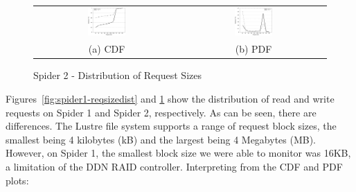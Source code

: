 \begin{figure}[!t]
\begin{center}
\begin{tabular}{cc}
\hspace*{-1cm}                                                           
{\includegraphics[width=0.27\textwidth]{./figs/spider2-reqSizeCDF.eps}}&
\hspace{-2mm}
{\includegraphics[width=0.27\textwidth]{./figs/spider2-reqSizePDF.eps}}\\
\small (a) CDF & \small(b) PDF \\
\end{tabular}
\vspace{-0.1in}
\caption{Spider 2 - Distribution of Request Sizes}
\label{fig:spider2-reqsizedist}
\end{center}
\end{figure}

Figures~\ref{fig:spider1-reqsizedist} and \ref{fig:spider2-reqsizedist}
show the distribution of read and write requests on Spider 1 and Spider 2,
respectively. As can be seen, there are differences. The Lustre file system
supports a range of request block sizes, the smallest being 4 kilobytes (kB)
and the largest being 4 Megabytes (MB).  However, on Spider 1, the smallest
block size we were able to monitor was 16KB, a limitation of the DDN RAID
controller. Interpreting from the CDF and PDF plots:

